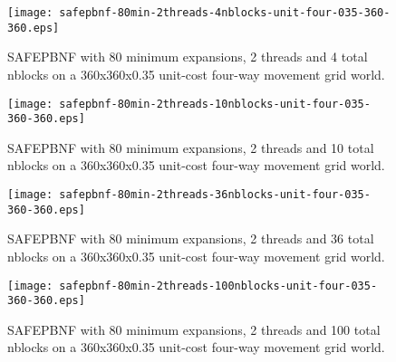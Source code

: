 \documentclass{article}
\begin{document}
\begin{figure}
\texttt{[image: safepbnf-80min-2threads-4nblocks-unit-four-035-360-360.eps]}
\caption{SAFEPBNF with 80 minimum expansions, 2 threads and 4 total
  nblocks on a 360x360x0.35 unit-cost four-way movement grid world.}
\end{figure}

\begin{figure}
\texttt{[image: safepbnf-80min-2threads-10nblocks-unit-four-035-360-360.eps]}
\caption{SAFEPBNF with 80 minimum expansions, 2 threads and 10 total
  nblocks on a 360x360x0.35 unit-cost four-way movement grid world.}
\end{figure}

\begin{figure}
\texttt{[image: safepbnf-80min-2threads-36nblocks-unit-four-035-360-360.eps]}
\caption{SAFEPBNF with 80 minimum expansions, 2 threads and 36 total
  nblocks on a 360x360x0.35 unit-cost four-way movement grid world.}
\end{figure}

\begin{figure}
\texttt{[image: safepbnf-80min-2threads-100nblocks-unit-four-035-360-360.eps]}
\caption{SAFEPBNF with 80 minimum expansions, 2 threads and 100 total
  nblocks on a 360x360x0.35 unit-cost four-way movement grid world.}
\end{figure}
\end{document}
